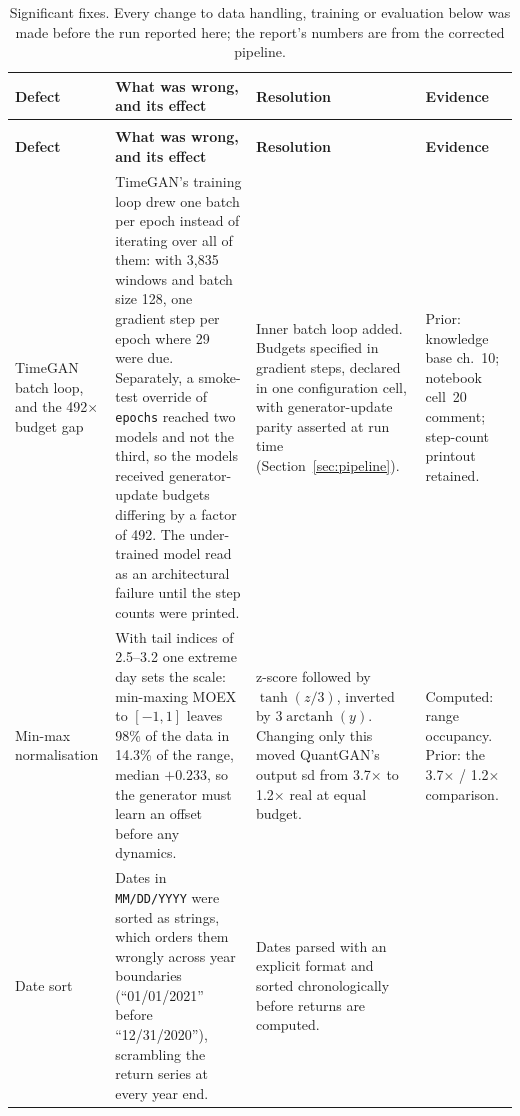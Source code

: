 \documentclass[11pt,a4paper]{article}
\makeatletter
\DeclareRobustCommand{\_}{\ifmmode\nfss@text{\textunderscore}\else\textunderscore\allowbreak\fi}
\makeatother
\begin{document}
{\footnotesize
\setlength{\tabcolsep}{4pt}
\begin{xltabular}{\linewidth}{@{}>{\raggedright\arraybackslash}p{3.0cm} >{\raggedright\arraybackslash}X >{\raggedright\arraybackslash}p{3.3cm} >{\raggedright\arraybackslash}p{2.6cm}@{}}
\caption{Significant fixes. Every change to data handling, training or evaluation below was made before the run reported here; the report's numbers are from the corrected pipeline.}\label{tab:fixes}\\
\toprule
\bfseries Defect & \bfseries What was wrong, and its effect & \bfseries Resolution & \bfseries Evidence \\
\midrule
\endfirsthead
{}\\
\toprule
\bfseries Defect & \bfseries What was wrong, and its effect & \bfseries Resolution & \bfseries Evidence \\
\midrule
\endhead
\bottomrule
\endfoot
TimeGAN batch loop, and the 492$\times$ budget gap &
TimeGAN's training loop drew one batch per epoch instead of iterating over all of them: with 3{,}835 windows and batch size 128, one gradient step per epoch where 29 were due. Separately, a smoke-test override of \texttt{epochs} reached two models and not the third, so the models received generator-update budgets differing by a factor of 492. The under-trained model read as an architectural failure until the step counts were printed. &
Inner batch loop added. Budgets specified in gradient steps, declared in one configuration cell, with generator-update parity asserted at run time (Section~\ref{sec:pipeline}). &
Prior: knowledge base ch.~10; notebook cell~20 comment; step-count printout retained. \\
\addlinespace
Min-max normalisation &
With tail indices of 2.5--3.2 one extreme day sets the scale: min-maxing MOEX to $[-1,1]$ leaves 98\% of the data in 14.3\% of the range, median $+0.233$, so the generator must learn an offset before any dynamics. &
z-score followed by $\tanh(z/3)$, inverted by $3\operatorname{arctanh}(y)$. Changing only this moved QuantGAN's output sd from 3.7$\times$ to 1.2$\times$ real at equal budget. &
Computed: range occupancy. Prior: the 3.7$\times$ / 1.2$\times$ comparison. \\
\addlinespace
Date sort &
Dates in \texttt{MM/DD/YYYY} were sorted as strings, which orders them wrongly across year boundaries (``01/01/2021'' before ``12/31/2020''), scrambling the return series at every year end. &
Dates parsed with an explicit format and sorted chronologically before returns are computed. &

\end{xltabular}}
\end{document}
